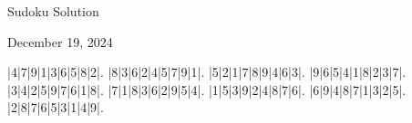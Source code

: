 \documentclass{article}
\begin{document}
\begin{center}
\Huge{Sudoku Solution}
\end{center}
\begin{center}
\Large{December 19, 2024}
\end{center}
\begin{sudoku}
|4|7|9|1|3|6|5|8|2|.
|8|3|6|2|4|5|7|9|1|.
|5|2|1|7|8|9|4|6|3|.
|9|6|5|4|1|8|2|3|7|.
|3|4|2|5|9|7|6|1|8|.
|7|1|8|3|6|2|9|5|4|.
|1|5|3|9|2|4|8|7|6|.
|6|9|4|8|7|1|3|2|5|.
|2|8|7|6|5|3|1|4|9|.
\end{sudoku}
\end{document}
